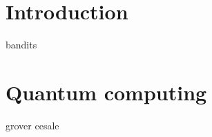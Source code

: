 \documentclass[
    10pt,
    b5paper,
    twoside,
    openright,
]{report} %
\begin{document}



\setcounter{tocdepth}{1}
\tableofcontents
\cleardoublepage

\chapter{Introduction}
{bandits}
\chapter{Quantum computing}
{grover}
{cesale}
\end{document}
